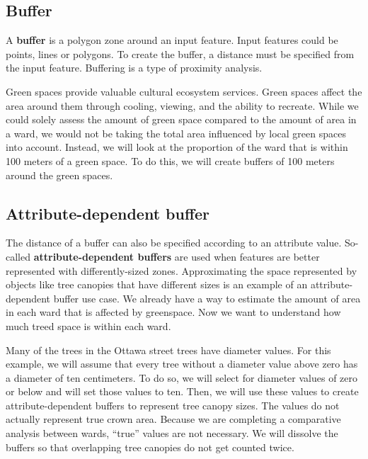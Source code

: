 \documentclass[
]{book}
\begin{document}
\hypertarget{buffer}{%
\subsection{Buffer}\label{buffer}}

A \textbf{buffer} is a polygon zone around an input feature. Input features could be points, lines or polygons. To create the buffer, a distance must be specified from the input feature. Buffering is a type of proximity analysis.

Green spaces provide valuable cultural ecosystem services. Green spaces affect the area around them through cooling, viewing, and the ability to recreate. While we could solely assess the amount of green space compared to the amount of area in a ward, we would not be taking the total area influenced by local green spaces into account. Instead, we will look at the proportion of the ward that is within 100 meters of a green space. To do this, we will create buffers of 100 meters around the green spaces.

\hypertarget{attribute-dependent-buffer}{%
\subsection{Attribute-dependent buffer}\label{attribute-dependent-buffer}}

The distance of a buffer can also be specified according to an attribute value. So-called \textbf{attribute-dependent buffers} are used when features are better represented with differently-sized zones. Approximating the space represented by objects like tree canopies that have different sizes is an example of an attribute-dependent buffer use case. We already have a way to estimate the amount of area in each ward that is affected by greenspace. Now we want to understand how much treed space is within each ward.

Many of the trees in the Ottawa street trees have diameter values. For this example, we will assume that every tree without a diameter value above zero has a diameter of ten centimeters. To do so, we will select for diameter values of zero or below and will set those values to ten. Then, we will use these values to create attribute-dependent buffers to represent tree canopy sizes. The values do not actually represent true crown area. Because we are completing a comparative analysis between wards, ``true'' values are not necessary. We will dissolve the buffers so that overlapping tree canopies do not get counted twice.
\end{document}
